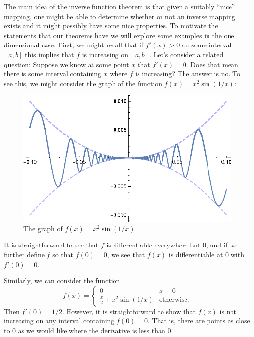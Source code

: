 The main idea of the inverse function theorem is that given a suitably ``nice'' mapping, one might be able to determine whether or not an inverse mapping exists and it might possibly have some nice properties. To motivate the statements that our theorems have we will explore some examples in the one dimensional case. First, we might recall that if $f'(x) > 0$ on some interval $[a, b]$ this implies that $f$ is increasing on $[a, b]$. Let's consider a related question: Suppose we know at some point $x$ that $f'(x) = 0$. Does that mean there is some interval containing $x$ where $f$ is increasing? The answer is no. To see this, we might consider the graph of the function $f(x) = x^2\sin(1/x)$:

\begin{figure}[h]
	\centering
	\includegraphics{plots_gr1.eps}
	\caption{The graph of $f(x) = x^2\sin(1/x)$}
	\label{fig:plots_gr1}
\end{figure}

It is straightforward to see that $f$ is differentiable everywhere but $0$, and if we further define $f$ so that $f(0) = 0$, we see that $f(x)$ is differentiable at $0$ with $f'(0) = 0$.

Similarly, we can consider the function 
\[f(x) = \begin{cases} 0 & x = 0 \\ \frac{x}{2} + x^2\sin(1/x) & \text{otherwise.} \end{cases}\]
Then $f'(0) = 1/2$. However, it is straightforward to show that $f(x)$ is not increasing on any interval containing $f(0) = 0$. That is, there are points as close to $0$ as we would like where the derivative is less than $0$.

